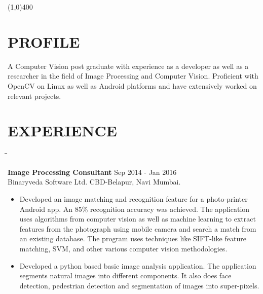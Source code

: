 \documentclass{res}
\begin{document}
 

\address{deven.patel2@gmail.com\\\hspace{6mm}+919819482499}         
\begin{resume}
\begin{center}
\line(1,0){400}
\end{center}
 
\section{PROFILE}
 A Computer Vision post graduate with  experience as a developer as well as a
 researcher in the field of Image Processing and Computer Vision.  Proficient
 with OpenCV  on Linux as well as Android platforms and have extensively worked on
 relevant projects. 
 \section{EXPERIENCE}
 
   \vspace{-0.05in}	
   \begin{tabbing}
   \hspace{2.3in}\= \hspace{2.6in}\= \kill %
   
    {\bf Image Processing Consultant}     \> \> Sep 2014 - Jan 2016\\
        Binaryveda Software Ltd. \>  \>CBD-Belapur, Navi Mumbai. 
   \end{tabbing}      %

    \begin{itemize}
        \item Developed an image matching and recognition feature for a
        photo-printer Android app.  An 85\% recognition accuracy  was achieved. The application uses algorithms from
        computer vision as well as machine learning to extract features from the  photograph using mobile
        camera and 	search a match from an existing database. The program uses techniques like SIFT-like feature matching, SVM, and other various computer vision methodologies. 	
        \item Developed
        a python based basic image analysis application. The application
        segments natural  images into different components. It  also does
        face detection, pedestrian 	detection and segmentation of  images
        into super-pixels.


\end{itemize}
\end{resume}
\end{document}
